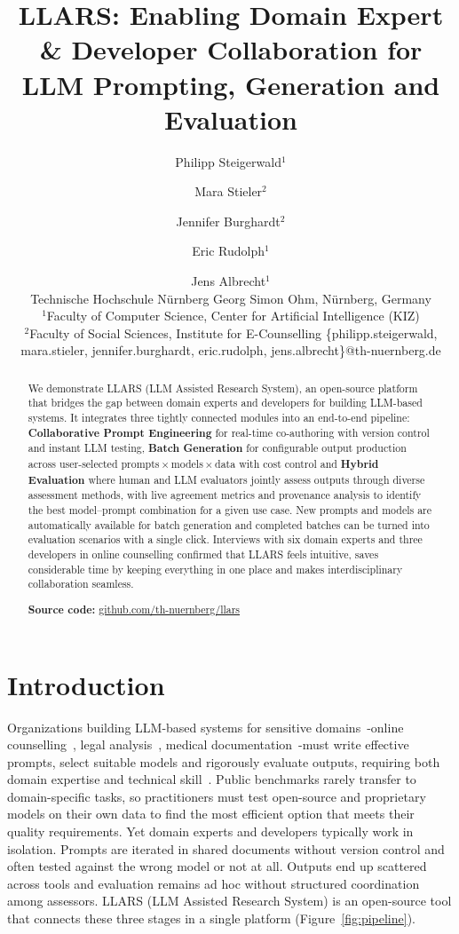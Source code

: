 \documentclass{article}
\title{LLARS: Enabling Domain Expert \& Developer Collaboration for LLM Prompting, Generation and Evaluation}
\author{
Philipp Steigerwald$^1$\and
Mara Stieler$^2$\and
Jennifer Burghardt$^2$\and
Eric Rudolph$^1$\and
Jens Albrecht$^1$\\
\affiliations
Technische Hochschule Nürnberg Georg Simon Ohm, Nürnberg, Germany\\
$^1$Faculty of Computer Science, Center for Artificial Intelligence (KIZ)\\
$^2$Faculty of Social Sciences, Institute for E-Counselling
\emails
\{philipp.steigerwald, mara.stieler, jennifer.burghardt, eric.rudolph, jens.albrecht\}@th-nuernberg.de
}
\begin{document}
\maketitle

\begin{abstract}
We demonstrate LLARS (LLM Assisted Research System), an open-source platform that bridges the gap between domain experts and developers for building LLM-based systems.
It integrates three tightly connected modules into an end-to-end pipeline:
\textbf{Collaborative Prompt Engineering} for real-time co-authoring with version control and instant LLM testing,
\textbf{Batch Generation} for configurable output production across user-selected prompts\,$\times$\,models\,$\times$\,data with cost control and
\textbf{Hybrid Evaluation} where human and LLM evaluators jointly assess outputs through diverse assessment methods, with live agreement metrics and provenance analysis to identify the best model--prompt combination for a given use case.
New prompts and models are automatically available for batch generation and completed batches can be turned into evaluation scenarios with a single click.
Interviews with six domain experts and three developers in online counselling confirmed that LLARS feels intuitive, saves considerable time by keeping everything in one place and makes interdisciplinary collaboration seamless.

\vspace{0.3em}
\noindent\textbf{Source code:} \url{github.com/th-nuernberg/llars} %
\end{abstract}

\section{Introduction}


Organizations building LLM-based systems for sensitive domains~\cite{chen2024critical,ling2025domain}\--online counselling~\cite{stade2024behavioral}, legal analysis~\cite{katz2024bar}, medical documentation~\cite{vanveen2024clinical}\--must write effective prompts, select suitable models and rigorously evaluate outputs, requiring both domain expertise and technical skill~\cite{zamfirescu2023johnny,schulhoff2024prompt}.
Public benchmarks rarely transfer to domain-specific tasks, so practitioners must test open-source and proprietary models on their own data to find the most efficient option that meets their quality requirements.
Yet domain experts and developers typically work in isolation. Prompts are iterated in shared documents without version control and often tested against the wrong model or not at all. Outputs end up scattered across tools and evaluation remains ad hoc without structured coordination among assessors.
LLARS (LLM Assisted Research System) is an open-source tool that connects these three stages in a single platform (Figure~\ref{fig:pipeline}).
\end{document}
